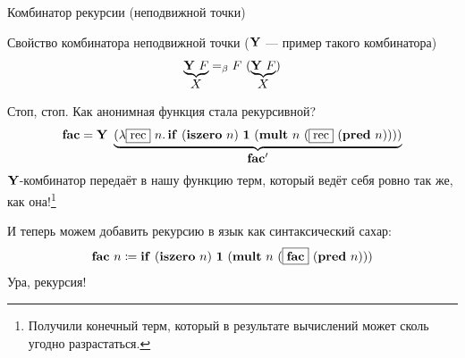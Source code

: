     \begin{frame}{Комбинатор рекурсии (неподвижной точки)}
        \pause
        \vspace{-0.5em}
        \begin{block}{Свойство комбинатора неподвижной точки ($\mathbf{Y}$ --- пример такого комбинатора)}
            \[
                \underbrace{\mathbf{Y} ~ F}_{\textstyle X} =_\beta F ~ (\underbrace{\mathbf{Y} ~ F}_{\textstyle X})
            \]
        \end{block}
        \pause
        \vspace{0.5em}
        Стоп, стоп. Как анонимная функция стала рекурсивной?
        \[
            \term{fac}
            \eqt
            \comb{Y} \ap \underbrace{(\lambda \framebox{rec} \ap n \ldotp \term{if} \ap (\term{iszero} \ap n) \ap \term{1} \ap (\term{mult} \ap n \ap (\framebox{rec} \ap (\term{pred} \ap n))))}_{\textstyle \term{fac'}}
        \]
        \pause
        $\mathbf{Y}$-комбинатор передаёт в нашу функцию терм, который ведёт себя ровно так же, как она!\footnote{Получили конечный терм, который в результате вычислений может сколь угодно разрастаться.}

        \pause
        \vspace{0.5em}

        И теперь можем добавить рекурсию в язык как синтаксический сахар:
        \[
            \term{fac} \ap n
            \termdef
            \term{if} \ap (\term{iszero} \ap n) \ap \term{1} \ap (\term{mult} \ap n \ap (\framebox{$\term{fac}$} \ap (\term{pred} \ap n)))
        \]
        Ура, рекурсия!
    \end{frame}

